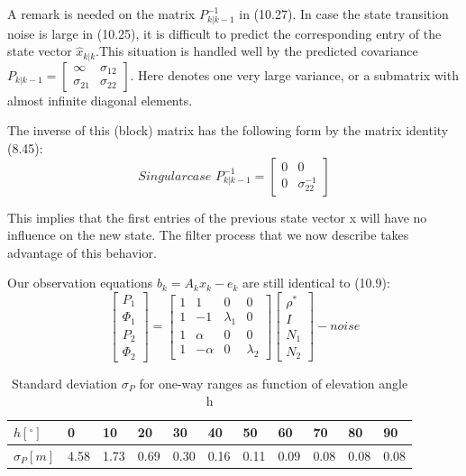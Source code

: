 A remark is needed on the matrix $P_{k|k-1}^{-1}$ in (10.27). In case the state transition noise is large in (10.25), it is difficult to predict the corresponding entry of the state vector $\hat{x}_{k|k}$.This situation is handled well by the predicted covariance
$P_{k|k-1}=\begin{bmatrix}
\infty & \sigma_{12} \\
\sigma_{21} & \sigma_{22}\end{bmatrix}$.
Here denotes one very large variance, or a submatrix with almost infinite diagonal elements.

The inverse of this (block) matrix has the following form by the matrix identity (8.45):
$$
Singular case \,\,P_{k|k-1}^{-1}=\begin{bmatrix}
0 & 0\\
0 & \sigma_{22}^{-1}\end{bmatrix}
$$

This implies that the first entries of the previous state vector x will have no influence on the new state. The filter process that we now describe takes advantage of this behavior.

Our observation equations $b_{k}=A_{k}x_{k}-e_{k}$ are still identical to (10.9):
$$
\begin{bmatrix}
P_{1}\\\Phi_{1}\\P_{2}\\\Phi_{2}
\end{bmatrix}
=\begin{bmatrix}
1&1&0&0\\
1&-1&\lambda_{1}&0\\
1&\alpha&0&0\\
1&-\alpha&0&\lambda_{2}
\end{bmatrix}
\begin{bmatrix}
\rho^{*}\\I\\N_{1}\\N_{2}
\end{bmatrix}
-noise
$$

\begin{table}[htbp]
	\caption{Standard deviation $\sigma_{P}$ for one-way ranges as function of elevation angle h}
	\begin{tabular}{lllllllllll}
		\hline
		$h[^{\circ}]$ & 0 & 10 & 20 & 30 & 40 & 50 & 60 & 70 & 80 & 90\\
		\hline
		$\sigma_{P}[m]$ & 4.58 & 1.73 & 0.69 & 0.30 & 0.16 & 0.11 & 0.09 & 0.08 & 0.08 & 0.08\\
		\hline
	\end{tabular}
\end{table}


